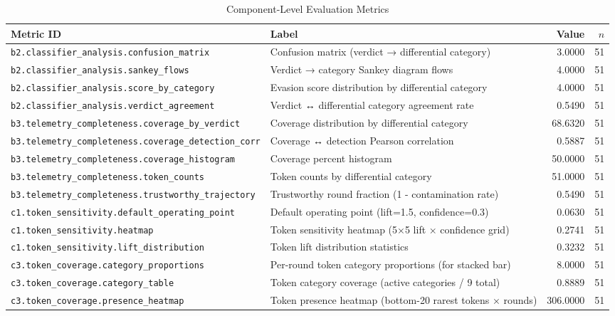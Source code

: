 \begin{table}[htbp]
\centering
\caption{Component-Level Evaluation Metrics}
\label{tab:component-metrics}
\begin{tabular}{llrr}
\toprule
Metric ID & Label & Value & $n$ \\
\midrule
\texttt{b2.classifier\_analysis.confusion\_matrix} & Confusion matrix (verdict → differential category) & 3.0000 & 51 \\
\texttt{b2.classifier\_analysis.sankey\_flows} & Verdict → category Sankey diagram flows & 4.0000 & 51 \\
\texttt{b2.classifier\_analysis.score\_by\_category} & Evasion score distribution by differential category & 4.0000 & 51 \\
\texttt{b2.classifier\_analysis.verdict\_agreement} & Verdict ↔ differential category agreement rate & 0.5490 & 51 \\
\midrule
\texttt{b3.telemetry\_completeness.coverage\_by\_verdict} & Coverage distribution by differential category & 68.6320 & 51 \\
\texttt{b3.telemetry\_completeness.coverage\_detection\_corr} & Coverage ↔ detection Pearson correlation & 0.5887 & 51 \\
\texttt{b3.telemetry\_completeness.coverage\_histogram} & Coverage percent histogram & 50.0000 & 51 \\
\texttt{b3.telemetry\_completeness.token\_counts} & Token counts by differential category & 51.0000 & 51 \\
\texttt{b3.telemetry\_completeness.trustworthy\_trajectory} & Trustworthy round fraction (1 - contamination rate) & 0.5490 & 51 \\
\midrule
\texttt{c1.token\_sensitivity.default\_operating\_point} & Default operating point (lift=1.5, confidence=0.3) & 0.0630 & 51 \\
\texttt{c1.token\_sensitivity.heatmap} & Token sensitivity heatmap (5×5 lift × confidence grid) & 0.2741 & 51 \\
\texttt{c1.token\_sensitivity.lift\_distribution} & Token lift distribution statistics & 0.3232 & 51 \\
\midrule
\texttt{c3.token\_coverage.category\_proportions} & Per-round token category proportions (for stacked bar) & 8.0000 & 51 \\
\texttt{c3.token\_coverage.category\_table} & Token category coverage (active categories / 9 total) & 0.8889 & 51 \\
\texttt{c3.token\_coverage.presence\_heatmap} & Token presence heatmap (bottom-20 rarest tokens × rounds) & 306.0000 & 51 \\

\end{tabular}
\end{table}
